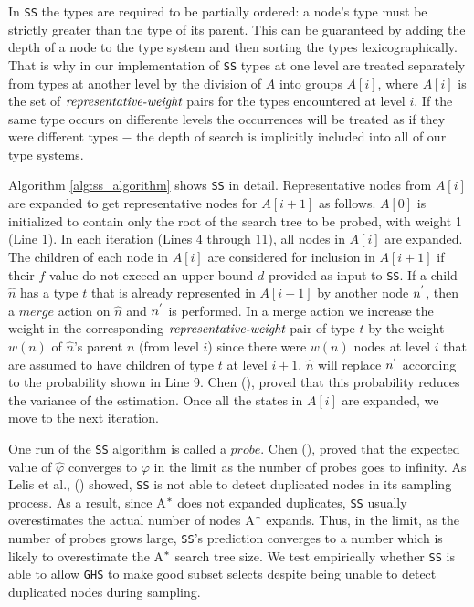 In \texttt{SS} the types are required to be partially ordered: a node's type must be strictly greater than the type of its parent. This can be guaranteed by adding the depth of a node to the type system and then sorting the types lexicographically. That is why in our implementation of \texttt{SS} types at one level are treated separately from types at another level by the division of $A$ into groups $A[i]$, where $A[i]$ is the set of $\emph{representative-weight}$ pairs for the types encountered at level $i$. If the same type occurs on differente levels the occurrences will be treated as if they were different types $-$ the depth of search is implicitly included into all of our type systems.

Algorithm \ref{alg:ss_algorithm} shows \texttt{SS} in detail. Representative nodes from $A[i]$ are expanded to get representative nodes for $A[i+1]$ as follows. $A[0]$ is initialized to contain only the root of the search tree to be probed, with weight 1 (Line 1). In each iteration (Lines 4 through 11), all nodes in $A[i]$ are expanded. The children of each node in $A[i]$ are considered for inclusion in $A[i+1]$ if their $f$-value do not exceed an upper bound $d$ provided as input to \texttt{SS}. If a child $\hat{n}$ has a type $t$ that is already represented in $A[i+1]$ by another node $n\sp{'}$, then a $merge$ action on $\hat{n}$ and $n\sp{'}$ is performed. In a merge action we increase the weight in the corresponding $\emph{representative-weight}$ pair of type $t$ by the weight $w(n)$ of $\hat{n}$'s parent $n$ (from level $i$) since there were $w(n)$ nodes at level $i$ that are assumed to have children of type $t$ at level $i+1$. $\hat{n}$ will replace $n\sp{'}$ according to the probability shown in Line 9. Chen (\citeyear{chen1992heuristic}), proved that this probability reduces the variance of the estimation. Once all the states in $A[i]$ are expanded, we move to the next iteration.

One run of the \texttt{SS} algorithm is called a $probe$. Chen (\citeyear{chen1992heuristic}), proved that the expected value of $\hat{\varphi}$ converges to $\varphi$ in the limit as the number of probes goes to infinity. As Lelis et al., (\citeyear{lelis2014estimating}) showed, \texttt{SS} is not able to detect duplicated nodes in its sampling process. As a result, since A$\sp{*}$ does not expanded duplicates, \texttt{SS} usually overestimates the actual number of nodes A$\sp{*}$ expands. Thus, in the limit, as the number of probes grows large, \texttt{SS}'s prediction converges to a number which  is likely to overestimate the A$\sp{*}$ search tree size. We test empirically whether \texttt{SS} is able to allow \texttt{GHS} to make good subset selects despite being unable to detect duplicated nodes during sampling.

